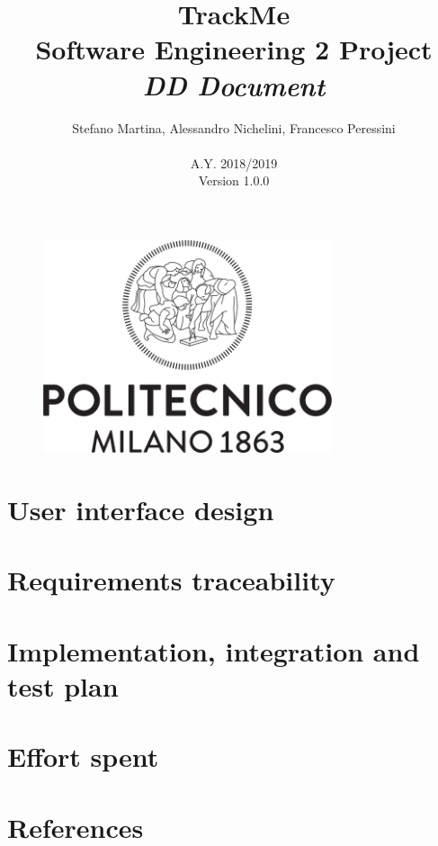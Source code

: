\documentclass{article}
\begin{document}
	\begin{figure}[t]
	\centering
	\includegraphics[height=6.25cm,keepaspectratio]{Figures/logo}
	\end{figure}
	
	\title{TrackMe \\ Software Engineering 2 Project \\ 
			\textit{DD Document} }
	\author{Stefano Martina, Alessandro Nichelini, Francesco Peressini
		\\ \\ A.Y. 2018/2019 \\ Version 1.0.0}
		
\maketitle
\newpage

\tableofcontents

\newpage



\section{User interface design}

\section{Requirements traceability}

\section{Implementation, integration and test plan}
 
\section{Effort spent}

\section{References}
\newpage


 
\end{document}
